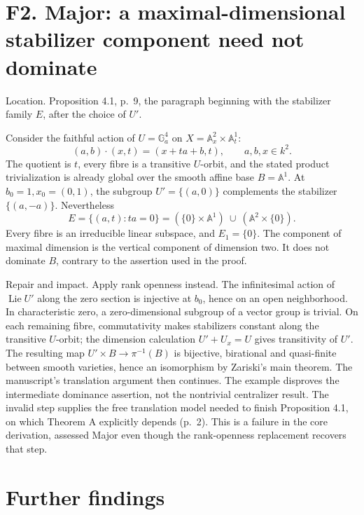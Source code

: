 \documentclass[10pt]{article}
\begin{document}
\section*{F2. Major: a maximal-dimensional stabilizer component need not dominate}
Location. Proposition 4.1, p. 9, the paragraph beginning with the stabilizer family \(E\), after the choice of \(U'\).\par
Consider the faithful action of \(U=\mathbb G_a^4\) on \(X=\mathbb A_x^2\times\mathbb A_t^1\): \[(a,b)\cdot(x,t)=(x+t a+b,t),\qquad a,b,x\in k^2.\] The quotient is \(t\), every fibre is a transitive \(U\)-orbit, and the stated product trivialization is already global over the smooth affine base \(B=\mathbb A^1\). At \(b_0=1,x_0=(0,1)\), the subgroup \(U'=\{(a,0)\}\) complements the stabilizer \(\{(a,-a)\}\). Nevertheless \[E=\{(a,t):t a=0\}
   =(\{0\}\times\mathbb A^1)\ \cup\ (\mathbb A^2\times\{0\}).\] Every fibre is an irreducible linear subspace, and \(E_1=\{0\}\). The component of maximal dimension is the vertical component of dimension two. It does not dominate \(B\), contrary to the assertion used in the proof.\par
Repair and impact. Apply rank openness instead. The infinitesimal action of \(\operatorname{Lie}U'\) along the zero section is injective at \(b_0\), hence on an open neighborhood. In characteristic zero, a zero-dimensional subgroup of a vector group is trivial. On each remaining fibre, commutativity makes stabilizers constant along the transitive \(U\)-orbit; the dimension calculation \(U'+U_x=U\) gives transitivity of \(U'\). The resulting map \(U'\times B\to\pi^{-1}(B)\) is bijective, birational and quasi-finite between smooth varieties, hence an isomorphism by Zariski’s main theorem. The manuscript’s translation argument then continues. The example disproves the intermediate dominance assertion, not the nontrivial centralizer result. The invalid step supplies the free translation model needed to finish Proposition 4.1, on which Theorem A explicitly depends (p. 2). This is a failure in the core derivation, assessed Major even though the rank-openness replacement recovers that step.\par
\section*{Further findings}
\end{document}
